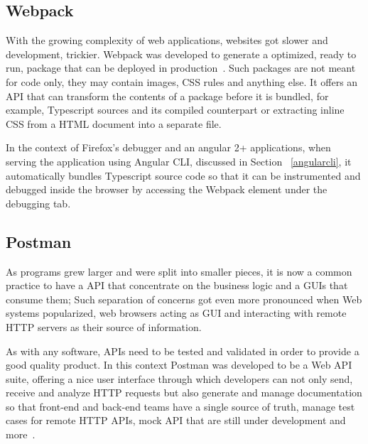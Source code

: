 \subsection{Webpack}
With the growing complexity of web applications, websites got slower and development, trickier. Webpack was developed to generate a optimized, ready to run, package that can be deployed in production~\cite{webpack}. Such packages are not meant for code only, they may contain images, \gls{CSS} rules and anything else. It offers an \gls{API} that can transform the contents of a package before it is bundled, for example, Typescript sources and its compiled counterpart or extracting inline \gls{CSS} from a \gls{HTML} document into a separate file.

In the context of Firefox's debugger and an angular 2+ applications, when serving the application using Angular \gls{CLI}, discussed in Section ~\ref{angularcli}, it automatically bundles Typescript source code so that it can be instrumented and debugged inside the browser by accessing the Webpack element under the debugging tab.

\subsection{Postman}
As programs grew larger and were split into smaller pieces, it is now a common practice to have a \gls{API} that concentrate on the business logic and a \gls{GUI}s that consume them; Such separation of concerns got even more pronounced when Web systems popularized, web browsers acting as \gls{GUI} and interacting with remote \gls{HTTP} servers as their source of information.

As with any software, \gls{API}s need to be tested and validated in order to provide a good quality product. In this context Postman was developed to be a Web \gls{API} suite, offering a nice user interface through which developers can not only send, receive and analyze \gls{HTTP} requests but also generate and manage documentation so that front-end and back-end teams have a single source of truth, manage test cases for remote \gls{HTTP} \gls{API}s, mock \gls{API} that are still under development and more~\cite{postman}.